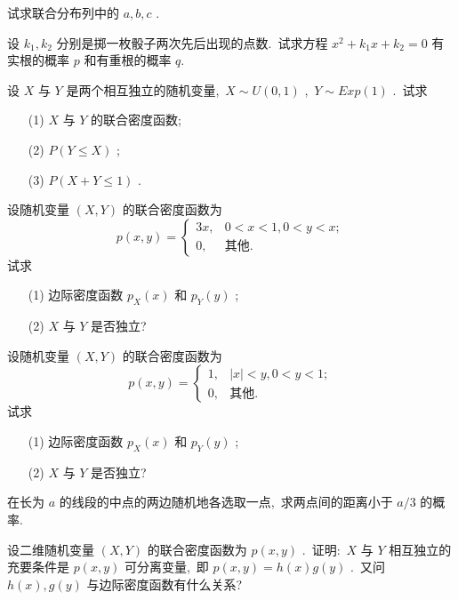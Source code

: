 \begin{xiti}
   	    试求联合分布列中的 $a,b,c$ .
   		\item 设 $k_1,k_2$ 分别是掷一枚骰子两次先后出现的点数.\ 试求方程 $x^2+k_1x+k_2=0$ 有实根的概率 $p$ 和有重根的概率 $q$.
   		\item 设 $X$ 与 $Y$ 是两个相互独立的随机变量,\ $X\sim U(0,1)$ ,\ $Y\sim Exp(1)$ .\ 试求
   		\begin{itemize}
   			\item[(1)] $X$ 与 $Y$ 的联合密度函数;
   			\item[(2)] $P(Y\leqslant X)$ ;
   			\item[(3)] $P(X+Y\leqslant1)$ .
   		\end{itemize}
   	    \item 设随机变量 $(X,Y)$ 的联合密度函数为
   	    \begin{equation*}
   	    	p(x,y)=\begin{cases}
   	    	3x, & 0<x<1,0<y<x;\\
   	    	0, & \text{其他}.
   	    	\end{cases}
   	    \end{equation*}
   	    试求
   	    \begin{itemize}
   	    	\item[(1)] 边际密度函数 $p_{X}(x)$ 和 $p_{Y}(y)$ ;
   	    	\item[(2)] $X$ 与 $Y$ 是否独立?
   	    \end{itemize}
       \item 设随机变量 $(X,Y)$ 的联合密度函数为
       \begin{equation*}
       	p(x,y)=\begin{cases}
       	1, & |x|<y,0<y<1;\\
       	0, & \text{其他}.
       	\end{cases}
       \end{equation*}
       试求
       \begin{itemize}
       	\item[(1)] 边际密度函数 $p_{X}(x)$ 和 $p_{Y}(y)$ ;
       	\item[(2)] $X$ 与 $Y$ 是否独立?
       \end{itemize}
       \item 在长为 $a$ 的线段的中点的两边随机地各选取一点,\ 求两点间的距离小于 $a/3$ 的概率.
       \item 设二维随机变量 $(X,Y)$ 的联合密度函数为 $p(x,y)$ .\ 证明:\ $X$ 与 $Y$ 相互独立的充要条件是 $p(x,y)$ 可分离变量,\ 即 $p(x,y)=h(x)g(y)$ .\ 又问 $h(x),g(y)$ 与边际密度函数有什么关系?
   \end{xiti}
